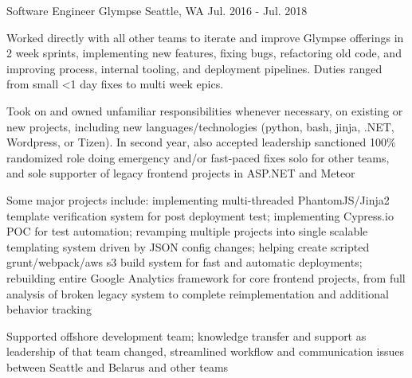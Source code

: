 \begin{cventries}
\cventry
{Software Engineer} %
{Glympse} %
{Seattle, WA} %
{Jul. 2016 - Jul. 2018} %
{
\begin{cvitems}
\item {Worked directly with all other teams to iterate and improve Glympse offerings in 2 week sprints, implementing new features, fixing bugs, refactoring old code, and improving process, internal tooling, and deployment pipelines. Duties ranged from small <1 day fixes to multi week epics. }
\item {Took on and owned unfamiliar responsibilities whenever necessary, on existing or new projects, including new languages/technologies (python, bash, jinja, .NET, Wordpress, or Tizen). In second year, also accepted leadership sanctioned 100\% randomized role doing emergency and/or fast-paced fixes solo for other teams, and sole supporter of legacy frontend projects in ASP.NET and Meteor}
\item {Some major projects include: implementing multi-threaded PhantomJS/Jinja2 template verification system for post deployment test; implementing Cypress.io POC for test automation; revamping multiple projects into single scalable templating system driven by JSON config changes; helping create scripted grunt/webpack/aws s3 build system for fast and automatic deployments; rebuilding entire Google Analytics framework for core frontend projects, from full analysis of broken legacy system to complete reimplementation and additional behavior tracking}
\item {Supported offshore development team; knowledge transfer and support as leadership of that team changed, streamlined workflow and communication issues between Seattle and Belarus and other teams}
\end{cvitems}
}


\end{cventries}
